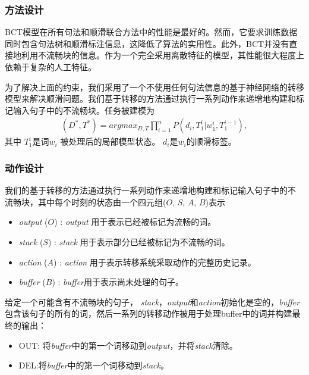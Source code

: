 \subsubsection{方法设计}

BCT模型在所有句法和顺滑联合方法中的性能是最好的。然而，它要求训练数据同时包含句法树和顺滑标注信息，这降低了算法的实用性。此外，BCT并没有直接地利用不流畅块的信息。作为一个完全采用离散特征的模型，其性能很大程度上依赖于复杂的人工特征。

为了解决上面的约束，我们采用了一个不使用任何句法信息的基于神经网络的转移模型来解决顺滑问题。我们基于转移的方法通过执行一系列动作来递增地构建和标记输入句子中的不流畅块。任务被建模为
\begin{equation}
\begin{split}
(D^*, T^*) = argmax_{D,T}\prod_{i=1}^{n}P(d_i, T_1^i|w_1^i,T_1^{i-1}),\nonumber
\end{split}
\end{equation}
其中 $T_1^i$是词$w_i$ 被处理后的局部模型状态。 $d_i$是$w_i$的顺滑标签。

\subsubsection*{动作设计}
我们的基于转移的方法通过执行一系列动作来递增地构建和标记输入句子中的不
流畅块，其中每个时刻的状态由一个四元组($O$, $S$, $A$, $B$)表示
\begin{itemize}
	\item \textit{output} ($O$) :  \textit{output} 用于表示已经被标记为流畅的词。
	\item \textit{stack} ($S$) : \textit{stack} 用于表示部分已经被标记为不流畅的词。 
	\item \textit{action} ($A$) : \textit{action} 用于表示转移系统采取动作的完整历史记录。
	\item \textit{buffer} ($B$) : \textit{buffer}用于表示尚未处理的句子。
\end{itemize}

给定一个可能含有不流畅块的句子， \textit{stack}，\textit{output}和\textit{action}初始化是空的，\textit{buffer}包含该句子的所有的词，然后一系列的转移动作被用于处理{buffer}中的词并构建最终的输出：
\begin{itemize}
	\item OUT: 将\textit {buffer}中的第一个词移动到\textit{output}，并将\textit{stack}清除。
	\item  DEL:将\textit{buffer}中的第一个词移动到\textit{stack}。
\end{itemize}

